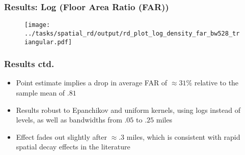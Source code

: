 \begin{frame}[t,label=far-main]
    \frametitle{Results: Log (Floor Area Ratio (FAR))} 
        \begin{figure}
            \centering
            \texttt{[image: ../tasks/spatial\_rd/output/rd\_plot\_log\_density\_far\_bw528\_triangular.pdf]}
            \label{fig:spatial_rd_log_far}
        \end{figure}
        \vfill\hfill
    \hyperlink{levels}{}
    \hspace{0.2em}
    \hyperlink{lapu}{}
    \hspace{0.2em}
    \hyperlink{bcr}{}
    \hspace{0.2em}
    \hyperlink{lps}{}
    \hspace{0.2em}
 \end{frame} 

 \begin{frame}
    \frametitle{Results ctd.} 
        \begin{itemize}
            \item Point estimate implies a drop in average FAR of $\approx 31\%$ relative to the sample mean of $.81$
            \item Results robust to Epanchikov and uniform kernels, using logs instead of levels, as well as bandwidths from $.05$ to $.25$ miles
            \item Effect fades out slightly after $\approx .3$ miles, which is consistent with rapid spatial decay effects in the literature \scriptsize{\cite{baum-snow_local_2024}}
        \end{itemize}
 \end{frame} 


